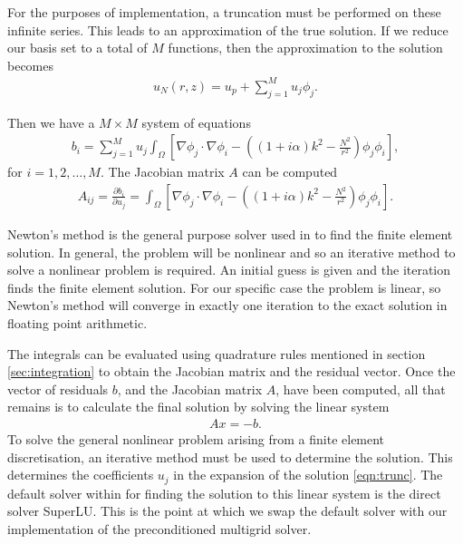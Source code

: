 For the purposes of implementation, a truncation must be performed on these infinite series.
This leads to an approximation of the true solution.
If we reduce our basis set to a total of $M$ functions, then the approximation to the solution becomes
\begin{align}
	u_N(r,z) = u_p + \sum_{j=1}^M u_j \phi_j. \label{eqn:trunc}
\end{align}

Then we have a $M\times M$ system of equations 
\begin{align}
	b_i = \sum_{j=1}^M u_j \int_\Omega \left[ \nabla \phi_j \cdot \nabla \phi_i - \left( (1+i\alpha)k^2 - \frac{N^2}{r^2}\right) \phi_j \phi_i \right],
\end{align}
for $i=1,2,\ldots,M$.
The Jacobian matrix $A$ can be computed 
\begin{align}
	A_{ij} = \frac{\partial b_i}{\partial u_j} = \int_\Omega \left[ \nabla \phi_j \cdot \nabla \phi_i - \left( (1+i\alpha)k^2 - \frac{N^2}{r^2}\right) \phi_j \phi_i \right].
\end{align}

Newton's method is the general purpose solver used in \oomph to find the finite element solution.
In general, the problem will be nonlinear and so an iterative method to solve a nonlinear problem is required.
An initial guess is given and the iteration finds the finite element solution.
For our specific case the problem is linear, so Newton's method will converge in exactly one iteration to the exact solution in floating point arithmetic.

The integrals can be evaluated using quadrature rules mentioned in section \ref{sec:integration} to obtain the Jacobian matrix and the residual vector.
Once the vector of residuals $b$, and the Jacobian matrix $A$, have been computed, all that remains is to calculate the final solution by solving the linear system
\begin{align}
	A x = -b.
\end{align}
To solve the general nonlinear problem arising from a finite element discretisation, an iterative method must be used to determine the solution.
This determines the coefficients $u_j$ in the expansion of the solution \eqref{eqn:trunc}.
The default solver within \oomph for finding the solution to this linear system is the direct solver SuperLU.
This is the point at which we swap the default solver with our implementation of the preconditioned multigrid solver.
